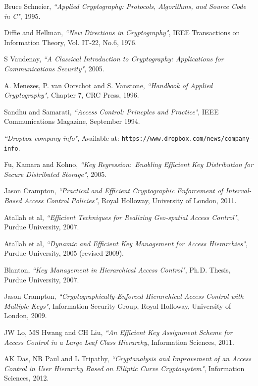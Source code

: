 \documentclass[10pt, titlepage]{article}
\begin{document}
\begin{thebibliography}{10}

Bruce Schneier, \emph{``Applied Cryptography: Protocols, Algorithms, and Source Code in C"}, 1995.

Diffie and Hellman, \emph{``New Directions in Cryptography"},
IEEE Transactions on Information Theory, Vol. IT-22, No.6, 1976.

S Vaudenay, \emph{``A Classical Introduction to Cryptography: Applications for Communications Security"}, 2005.

A. Menezes, P. van Oorschot and S. Vanstone, \emph{``Handbook of Applied Cryptography"}, Chapter 7, CRC Press, 1996.

Sandhu and Samarati, \emph{``Access Control: Princples and Practice"},
IEEE Communications Magazine, September 1994.

\emph{``Dropbox company info"},
Available at: \texttt{https://www.dropbox.com/news/company-info}.

Fu, Kamara and Kohno, \emph{``Key Regression$\colon$ Enabling Efficient Key Distribution for Secure Distributed Storage"}, 2005.

Jason Crampton, \emph{``Practical and Efficient Cryptographic Enforcement of Interval-Based
Access Control Policies"}, Royal Holloway, University of London, 2011.

Atallah et al, \emph{``Efficient Techniques for Realizing Geo-spatial Access Control"},  Purdue University, 2007.

Atallah et al, \emph{``Dynamic and Efficient Key Management for Access Hierarchies"}, Purdue University, 2005 (revised 2009).

Blanton, \emph{``Key Management in Hierarchical Access Control"}, Ph.D. Thesis, Purdue University, 2007.

Jason Crampton, \emph{``Cryptographically-Enforced Hierarchical
Access Control with Multiple Keys"}, Information Security Group, Royal Holloway, University of London, 2009.

JW Lo, MS Hwang and CH Liu, \emph{``An Efficient Key Assignment Scheme for Access Control in a Large Leaf Class Hierarchy}, Information Sciences, 2011.

AK Das, NR Paul and L Tripathy, \emph{``Cryptanalysis and Improvement of an Access Control in User Hierarchy Based on Elliptic Curve Cryptosystem"}, Information Sciences, 2012.


\end{thebibliography}
\end{document}
